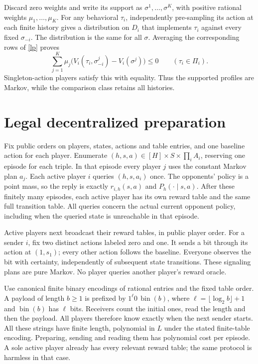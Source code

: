 \documentclass[11pt]{article}
\begin{document}
Discard zero weights and write its support as
$\sigma^1,\ldots,\sigma^K$, with positive rational weights
$\mu_1,\ldots,\mu_K$. For any behavioral $\tau_i$, independently
pre-sampling its action at each finite history gives a distribution on
$D_i$ that implements $\tau_i$ against every fixed $\sigma_{-i}$.
The distribution is the same for all $\sigma$. Averaging the corresponding
rows of \eqref{lp} proves
\begin{equation}\label{allpolicies}
 \sum_{j=1}^K\mu_j
       \bigl(V_i(\tau_i,\sigma^j_{-i})-V_i(\sigma^j)\bigr)\leq0
       \qquad(\tau_i\in\Pi_i).
\end{equation}
Singleton-action players satisfy this with equality. Thus the supported
profiles are Markov, while the comparison class retains all histories.

\section{Legal decentralized preparation}
Fix public orders on players, states, actions and table entries, and
one baseline action for each player. Enumerate $(h,s,a)\in[H]\times
S\times\prod_iA_i$, reserving one episode for each triple.
In that episode every player $j$ uses the constant Markov plan $a_j$.
Each active player $i$ queries $(h,s,a_i)$ once. The opponents' policy
is a point mass, so the reply is exactly $r_{i,h}(s,a)$ and
$P_h(\cdot\mid s,a)$. After these finitely many episodes, each active
player has its own reward table and the same full transition table.
All queries concern the actual current opponent policy, including when
the queried state is unreachable in that episode.

Active players next broadcast their reward tables, in public player
order. For a sender $i$, fix two distinct actions labeled zero and one.
It sends a bit through its action at $(1,s_1)$; every other action follows
the baseline. Everyone observes the bit with certainty, independently
of subsequent state transitions. These signaling plans are pure Markov.
No player queries another player's reward oracle.

Use canonical finite binary encodings of rational entries and the fixed
table order. A payload of length $b\geq1$ is prefixed by
$1^\ell0\,\operatorname{bin}(b)$, where
$\ell=\lfloor\log_2 b\rfloor+1$ and $\operatorname{bin}(b)$ has $\ell$
bits. Receivers count the initial ones, read the length and then the
payload. All players therefore know exactly when the next sender starts.
All these strings have finite length, polynomial in $L$ under the stated
finite-table encoding. Preparing, sending and reading them has
polynomial cost per episode. A sole active player already has every
relevant reward table; the same protocol is harmless in that case.
\end{document}
